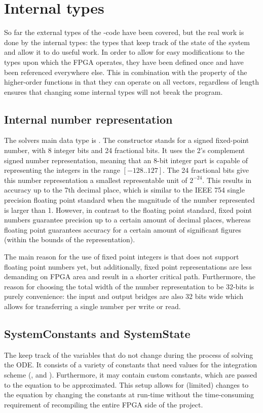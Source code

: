 \section{Internal types}
So far the external types of the \clash{}-code have been covered, but the real work is done by the internal types: the types that keep track of the state of the system and allow it to do useful work. In order to allow for easy modifications to the types upon which the FPGA operates, they have been defined once and have been referenced everywhere else. This in combination with the property of the higher-order functions in \clash{} that they can operate on all vectors, regardless of length ensures that changing some internal types will not break the program.

\subsection{Internal number representation}
The solvers main data type is . The constructor  stands for a signed fixed-point number, with 8 integer bits and 24 fractional bits. It uses the 2's complement signed number representation, meaning that an 8-bit integer part is capable of representing the integers in the range $[-128..127]$. The 24 fractional bits give this number representation a smallest representable unit of $2^{-24}$. This results in accuracy up to the 7th decimal place, which is similar to the IEEE 754 single precision floating point standard when the magnitude of the number represented is larger than 1. However, in contrast to the floating point standard, fixed point numbers guarantee precision up to a certain amount of decimal places, whereas floating point guarantees accuracy for a certain amount of significant figures (within the bounds of the representation).

The main reason for the use of fixed point integers is that \clash{} does not support floating point numbers yet, but additionally, fixed point representations are less demanding on FPGA area and result in a shorter critical path. Furthermore, the reason for choosing the total width of the number representation to be 32-bits is purely convenience: the input and output bridges are also 32 bits wide which allows for transferring a single number per write or read.

\subsection{SystemConstants and SystemState}
The  keep track of the variables that do not change during the process of solving the ODE. It consists of a variety of constants that need values for the integration scheme (,  and ). Furthermore, it may contain custom constants, which are passed to the equation to be approximated. This setup allows for (limited) changes to the equation by changing the constants at run-time without the time-consuming requirement of recompiling the entire FPGA side of the project.

